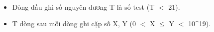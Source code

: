 \begin{itemize}
	\item     Dòng đầu ghi số nguyên dương T là số test (T $<$ 21).   
	\item     T dòng sau mỗi dòng ghi cặp số X, Y (0 $<$ X  $\le$  Y $<$ 10^19).   
\end{itemize}

\